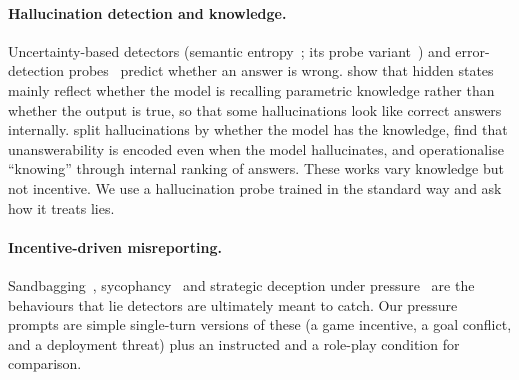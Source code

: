\paragraph{Hallucination detection and knowledge.}
Uncertainty-based detectors (semantic entropy~\citep{kuhn2023semantic,farquhar2024detecting}; its probe variant~\citep{kossen2024semantic}) and error-detection probes~\citep{orgad2024llms} predict whether an answer is wrong. \citet{cheang2025really} show that hidden states mainly reflect whether the model is recalling parametric knowledge rather than whether the output is true, so that some hallucinations look like correct answers internally. \citet{simhi2024distinguishing,simhi2025trust} split hallucinations by whether the model has the knowledge, \citet{slobodkin2023curious} find that unanswerability is encoded even when the model hallucinates, and \citet{gekhman2025insideout} operationalise ``knowing'' through internal ranking of answers. These works vary knowledge but not incentive. We use a hallucination probe trained in the standard way and ask how it treats lies.

\paragraph{Incentive-driven misreporting.}
Sandbagging~\citep{vanderweij2024sandbagging}, sycophancy~\citep{sharma2023sycophancy} and strategic deception under pressure~\citep{scheurer2023strategically,park2024deception} are the behaviours that lie detectors are ultimately meant to catch. Our pressure prompts are simple single-turn versions of these (a game incentive, a goal conflict, and a deployment threat) plus an instructed and a role-play condition for comparison.
